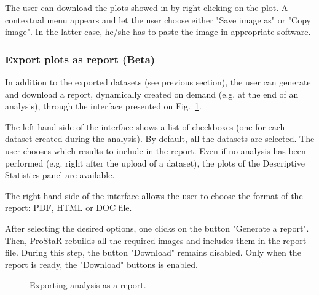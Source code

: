 \documentclass[12pt]{article}
\begin{document}
{{The user can download the plots showed in  by 
right-clicking on the plot. A contextual menu appears and let the user 
choose either "Save image as" or "Copy image". In the latter case, he/she has 
to paste the image in appropriate software.}

\subsubsection{Export plots as report (Beta)}\label{sec:Report}
In addition to the exported datasets (see previous section), the user can generate and download a report, dynamically created on demand (e.g. at the end of an analysis), through the interface presented on Fig.~\ref{fig:exportReport}.

The left hand side of the interface shows a list of checkboxes (one for each dataset created during the analysis). By default, all the datasets are selected. The user chooses which results to include in the report. Even if no analysis has been performed (e.g. right after the upload of a dataset), the plots of the Descriptive Statistics panel are available.

The right hand side of the interface allows the user to choose the format of the report: PDF, HTML or DOC file. 

After selecting the desired options, one clicks on the button "Generate a report". Then, ProStaR rebuilds all the required images and includes them in the report file. During this step, the button "Download" remains disabled. Only when the report is ready, the "Download" buttons is enabled.

\begin {figure}
\centering
{}
\caption{Exporting analysis as a report.}\label{fig:exportReport}
\end {figure}

}
\end{document}
